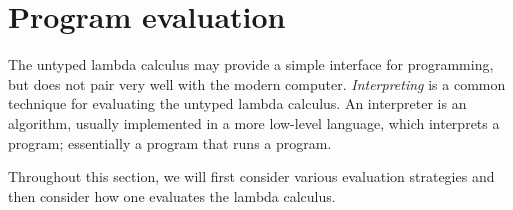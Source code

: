 \chapter{Program evaluation}
The untyped lambda calculus may provide a simple interface for programming, but does not pair very well with the modern computer.
\textit{Interpreting} is a common technique for evaluating the untyped lambda calculus.
An interpreter is an algorithm, usually implemented in a more low-level language, which interprets a program; essentially a program that runs a program.

Throughout this section, we will first consider various evaluation strategies and then consider how one evaluates the lambda calculus.
\clearpage






